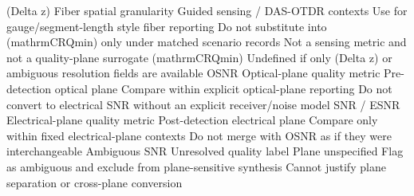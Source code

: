 {}\markdownRendererPipe{} (\markdownRendererBackslash{}Delta z) \markdownRendererPipe{} Fiber spatial granularity \markdownRendererPipe{} Guided sensing / DAS-OTDR contexts \markdownRendererPipe{} Use for gauge/segment-length style fiber reporting \markdownRendererPipe{} Do not substitute into (\markdownRendererBackslash{}mathrm\markdownRendererLeftBrace{}CRQ\markdownRendererRightBrace{}\markdownRendererLeftBrace{}\markdownRendererBackslash{}min\markdownRendererRightBrace{}) only under matched scenario records \markdownRendererPipe{} Not a sensing metric and not a quality-plane surrogate \markdownRendererPipe{}\markdownRendererSoftLineBreak
{}\markdownRendererPipe{} (\markdownRendererBackslash{}mathrm\markdownRendererLeftBrace{}CRQ\markdownRendererRightBrace{}\markdownRendererLeftBrace{}\markdownRendererBackslash{}min\markdownRendererRightBrace{}) \markdownRendererPipe{} Undefined if only (\markdownRendererBackslash{}Delta z) or ambiguous resolution fields are available \markdownRendererPipe{}\markdownRendererSoftLineBreak
{}\markdownRendererPipe{} OSNR \markdownRendererPipe{} Optical-plane quality metric \markdownRendererPipe{} Pre-detection optical plane \markdownRendererPipe{} Compare within explicit optical-plane reporting \markdownRendererPipe{} Do not convert to electrical SNR without an explicit receiver/noise model \markdownRendererPipe{}\markdownRendererSoftLineBreak
{}\markdownRendererPipe{} SNR / ESNR \markdownRendererPipe{} Electrical-plane quality metric \markdownRendererPipe{} Post-detection electrical plane \markdownRendererPipe{} Compare only within fixed electrical-plane contexts \markdownRendererPipe{} Do not merge with OSNR as if they were interchangeable \markdownRendererPipe{}\markdownRendererSoftLineBreak
{}\markdownRendererPipe{} Ambiguous SNR \markdownRendererPipe{} Unresolved quality label \markdownRendererPipe{} Plane unspecified \markdownRendererPipe{} Flag as ambiguous and exclude from plane-sensitive synthesis \markdownRendererPipe{} Cannot justify plane separation or cross-plane conversion \markdownRendererPipe{}\markdownRendererParagraphSeparator
